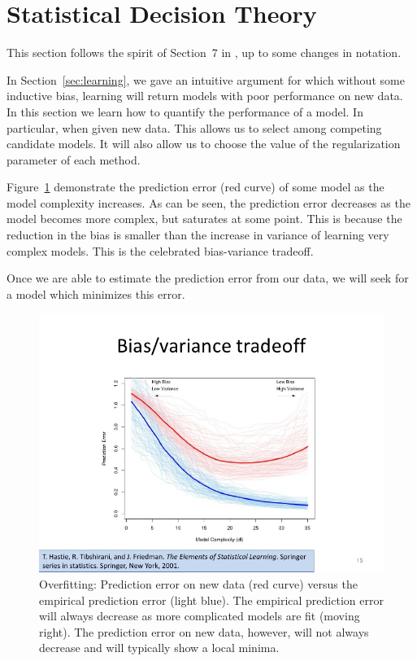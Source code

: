 
\section{Statistical Decision Theory}
\label{sec:desicion_theory}

This section follows the spirit of Section~7 in \cite{hastie_elements_2003}, up to some changes in notation.

In Section~\ref{sec:learning}, we gave an intuitive argument for which without some inductive bias, learning will return models with poor performance on new data.
In this section we learn how to quantify the performance of a model. In particular, when given new data. This allows us to select among competing candidate models. It will also allow us to choose the value of the regularization parameter of each method.

Figure~\ref{fig:bias_variance} demonstrate the prediction error (red curve) of some model as the model complexity increases. As can be seen, the prediction error decreases as the model becomes more complex, but saturates at some point. 
This is because the reduction in the bias is smaller than the increase in variance of learning very complex models.
This is the celebrated bias-variance tradeoff.

Once we are able to estimate the prediction error from our data, we will seek for a model which minimizes this error.

\begin{figure}[h]
        \centering
        \includegraphics[width=1\textwidth]{art/support-vector-machine-15-728}
        \caption{Overfitting: 
        Prediction error on new data (red curve) versus the empirical prediction error (light blue).
        The empirical prediction error will always decrease as more complicated models are fit (moving right).
        The prediction error on new data, however, will not always decrease and will typically show a local minima.
        \label{fig:bias_variance}}
\end{figure}

